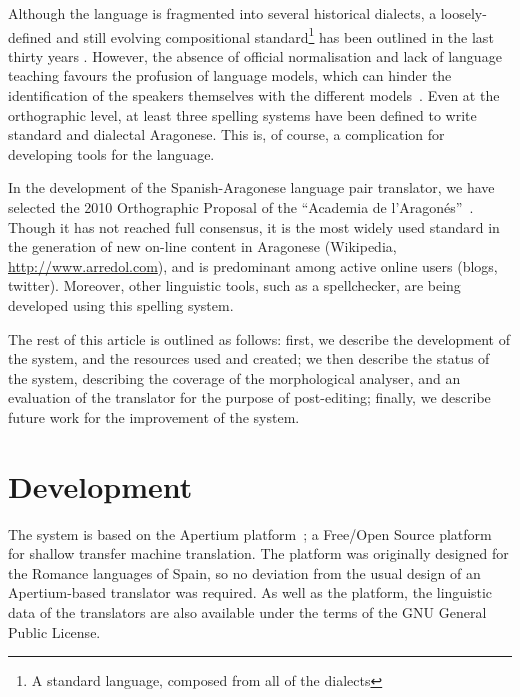 \documentclass[10pt, a4paper]{article}
\begin{document}
  Although the language is fragmented into several historical dialects, a loosely-defined and still evolving compositional standard\footnote{A standard language, composed from all of the dialects} has been outlined in the last thirty years \cite{Berceo,Metzeltin,EFA}. However, the absence of official normalisation and lack of language teaching favours the profusion of language models, which can hinder the identification of the speakers themselves with the different models~\cite{Paricio}. Even at the orthographic level, at least three spelling systems have been defined to write standard and dialectal Aragonese. This is, of course, a complication for developing tools for the language. 

  In the development of the Spanish-Aragonese language pair translator, we have selected the 2010 Orthographic Proposal of the ``Academia de l'Aragonés''~\cite{EFA}. Though it has not reached full consensus, it is the most widely used standard in the generation of new on-line content in Aragonese (Wikipedia, \url{http://www.arredol.com}), and is predominant among active online users (blogs, twitter). Moreover, other linguistic tools, such as a spellchecker, are being developed using this spelling system. %
  
  The rest of this article is outlined as follows: first, we describe the development of the system, and the resources used and created; we then describe the status of the system, describing the coverage of the morphological analyser, and an evaluation of the translator for the purpose of post-editing; finally, we describe future work for the improvement of the system.
  
  \section{Development}
  
  The system is based on the Apertium platform~\cite{Forcada}; a Free/Open Source platform for shallow transfer machine translation. The platform was originally designed for the Romance languages of Spain, so no deviation from the usual design of an Apertium-based translator was required. As well as the platform, the linguistic data of the translators are also available under the terms of the GNU General Public License.
  
\end{document}
